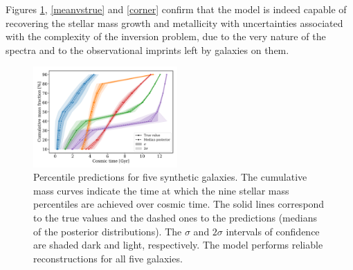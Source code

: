 Figures \ref{examples}, \ref{meanvstrue} and \ref{corner} confirm that the model is indeed capable of recovering the stellar mass growth and metallicity with uncertainties associated with the complexity of the inversion problem, due to the very nature of the spectra and to the observational imprints left by galaxies on them.  \\



\begin{figure}[t]
    \centering
    \includegraphics[width=0.49\textwidth]{images/posterior/cummul_mass_growth_2.pdf}
    \caption{Percentile predictions for five synthetic galaxies. The cumulative mass curves indicate the time at which the nine stellar mass percentiles are achieved over cosmic time. The solid lines correspond to the true values and the dashed ones to the predictions (medians of the posterior distributions). The $\sigma$ and $2 \sigma$ intervals of confidence are shaded dark and light, respectively. The model performs reliable reconstructions for all five galaxies.}
    \label{examples}
\end{figure}

